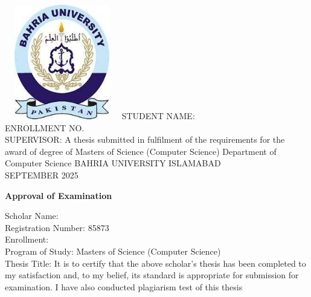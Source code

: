 \clearpage\thispagestyle{empty}
\begin{center}
	\textbf{\ThesisTitle} 
	\vskip 0.8in
	\includegraphics[width=5.0cm, height=5.0cm]{Extras/Logo.jpg}
	\vskip 0.6in
	STUDENT NAME: \AuthorName \\ ENROLLMENT NO. \EnrollmentNumber \\ SUPERVISOR:  \SupervisorName
	\vskip 0.6in
	A thesis submitted in fulfilment of the requirements for the award 
	of degree of Masters of Science (Computer Science)
	\vskip 0.6in
	Department of Computer Science \vskip 0.2in
	BAHRIA UNIVERSITY ISLAMABAD\\ 
	\vskip 0.6in SEPTEMBER 2025
\end{center}
\newpage
{}
\begin{center}\large\textbf{Approval of Examination}\\
\end{center}
\vskip 0.45in
Scholar Name:  \AuthorName
\\ Registration Number: 85873
\\ Enrollment: \EnrollmentNumber
\\ Program of Study: Masters of Science (Computer Science)
\\ Thesis Title: \ThesisTitle
\newline \newline
It is to certify that the above scholar's thesis has been completed to my satisfaction and, to my belief, its
standard is appropriate for submission for examination. I have also conducted plagiarism test of this thesis
